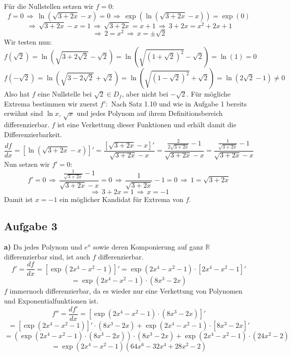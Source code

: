 \documentclass[a4paper,graphics,11pt]{article}
\newcommand{\aufgabe}[1]{\subsection*{Aufgabe #1}}
\begin{document}
Für die Nullstellen setzen wir $f = 0$:
$$
    f = 0 \,\Longrightarrow\, \ln\left(\sqrt{3+2x}-x\right) = 0
    \,\Longrightarrow\, \exp\left(\ln\left(\sqrt{3+2x}-x\right)\right) = \exp(0)
$$$$
    \,\Longrightarrow\, \sqrt{3+2x} -x = 1 \,\Longrightarrow\, \sqrt{3+2x} = x+1
    \,\Longrightarrow\, 3+2x = x^2+2x+1
$$$$
    \,\Longrightarrow\, 2 = x^2 \,\Longrightarrow\, x = \pm\sqrt{2}
$$
Wir testen nun:
$$
    f(\sqrt{2}) = \ln\left(\sqrt{3+2\sqrt{2}}-\sqrt{2}\right)
    = \ln\left(\sqrt{(1+\sqrt{2})^2} -\sqrt{2}\right)
    = \ln(1) = 0
$$$$
    f(-\sqrt{2}) = \ln\left(\sqrt{3-2\sqrt{2}}+\sqrt{2}\right)
    = \ln\left(\sqrt{(1-\sqrt{2})^2} +\sqrt{2}\right)
    = \ln(2\sqrt{2}-1) \neq 0
$$
Also hat $f$ eine Nullstelle bei $\sqrt{2} \in D_f$, aber nicht bei $-\sqrt{2}$.
\newpage
Für mögliche Extrema bestimmen wir zuerst $f'\colon$
Nach Satz 1.10 und wie in Aufgabe 1 bereits erwähnt sind $\ln x$, $\sqrt{x}$ und jedes Polynom auf ihrem
Definitionsbereich differenzierbar. $f$ ist eine Verkettung dieser Funktionen und erhält damit die Differenzierbarkeit.
$$
    \frac{df}{dx} = \left[\ln\left(\sqrt{3+2x}-x\right)\right]'
    = \frac{\left[\sqrt{3+2x}-x\right]'}{\sqrt{3+2x} -x}
    = \frac{\frac{2}{2\sqrt{3+2x}}-1}{\sqrt{3+2x} -x}
    = \frac{\frac{1}{\sqrt{3+2x}}-1}{\sqrt{3+2x}-x}
$$
Nun setzen wir $f' = 0\colon$
$$
    f'=0 \,\Longrightarrow\, \frac{\frac{1}{\sqrt{3+2x}} -1}{\sqrt{3+2x} -x} = 0
    \,\Longrightarrow\, \frac{1}{\sqrt{3+2x}} -1 = 0
    \,\Longrightarrow\, 1 = \sqrt{3+2x}
$$$$
    \,\Longrightarrow\, 3+2x = 1
    \,\Longrightarrow\, x = -1
$$
Damit ist $x = -1$ ein möglicher Kandidat für Extrema von $f$.

\aufgabe{3}

\textbf{a)}
Da jedes Polynom und $e^x$ sowie deren Komponierung auf ganz $\mathbb{R}$ differenzierbar sind, ist auch $f$
differenzierbar.
$$
    f' = \frac{df}{dx} = \left[\exp(2x^4-x^2-1)\right]'
    = \exp(2x^4-x^2-1)\cdot \left[2x^4-x^2-1\right]'
$$$$
    = \exp(2x^4-x^2-1) \cdot (8x^3-2x)
$$
$f$ immernoch differenzierbar, da es wieder nur eine Verkettung von Polynomen und Exponentialfunktionen ist.
$$
    f'' = \frac{df'}{dx} = \left[\exp(2x^4-x^2-1)\cdot (8x^3-2x)\right]'
$$$$
    = [\exp(2x^4-x^2-1)]'\cdot(8x^3-2x) + \exp(2x^4-x^2-1)\cdot[8x^3-2x]'
$$$$
    = \left(\exp(2x^4-x^2-1) \cdot (8x^3-2x)\right) \cdot(8x^3-2x) + \exp(2x^4-x^2-1)\cdot(24x^2-2)
$$$$
    = \exp(2x^4-x^2-1)(64x^6-32x^4+28x^2-2)
$$
\end{document}
